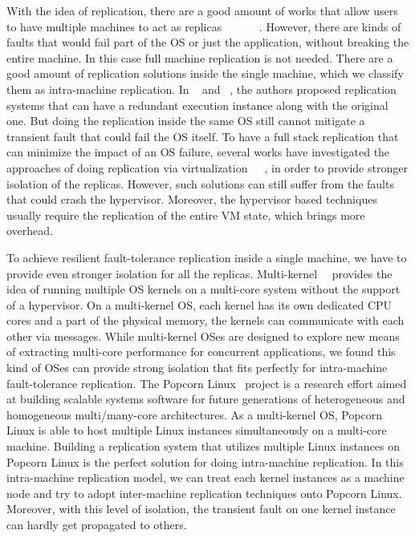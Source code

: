 With the idea of replication, there are a good amount of works that allow users to have multiple machines to act as replicas ~\cite{guo2014rex}~\cite{kapritsos2012all}~\cite{cui2015p}~\cite{zagorodnov2009practical}~\cite{singh2009zeno}~\cite{mao2008mencius}. However, there are kinds of faults that would fail part of the OS or just the application, without breaking the entire machine. In this case full machine replication is not needed. There are a good amount of replication solutions inside the single machine, which we classify them as intra-machine replication. In ~\cite{zhang2012runtime} and ~\cite{lee2010respec}, the authors proposed replication systems that can have a redundant execution instance along with the original one. But doing the replication inside the same OS still cannot mitigate a transient fault that could fail the OS itself. To have a full stack replication that can minimize the impact of an OS failure, several works have investigated the approaches of doing replication via virtualization~\cite{bressoud1996hypervisor}~\cite{lorch2015tardigrade}~\cite{dunlap2002revirt}, in order to provide stronger isolation of the replicas. However, such solutions can still suffer from the faults that could crash the hypervisor. Moreover, the hypervisor based techniques usually require the replication of the entire VM state, which brings more overhead.

To achieve resilient fault-tolerance replication inside a single machine, we have to provide even stronger isolation for all the replicas. Multi-kernel~\cite{baumann2009multikernel}~\cite{barbalace2014popcorn} provides the idea of running multiple OS kernels on a multi-core system without the support of a hypervisor. On a multi-kernel OS, each kernel has its own dedicated CPU cores and a part of the physical memory, the kernels can communicate with each other via messages. While multi-kernel OSes are designed to explore new means of extracting multi-core performance for concurrent applications, we found this kind of OSes can provide strong isolation that fits perfectly for intra-machine fault-tolerance replication. The Popcorn Linux~\cite{barbalace2014popcorn} project is a research effort aimed at building scalable systems software for future generations of heterogeneous and homogeneous multi/many-core architectures. As a multi-kernel OS, Popcorn Linux is able to host multiple Linux instances simultaneously on a multi-core machine. Building a replication system that utilizes multiple Linux instances on Popcorn Linux is the perfect solution for doing intra-machine replication. In this intra-machine replication model, we can treat each kernel instances as a machine node and try to adopt inter-machine replication techniques onto Popcorn Linux. Moreover, with this level of isolation, the transient fault on one kernel instance can hardly get propagated to others.

